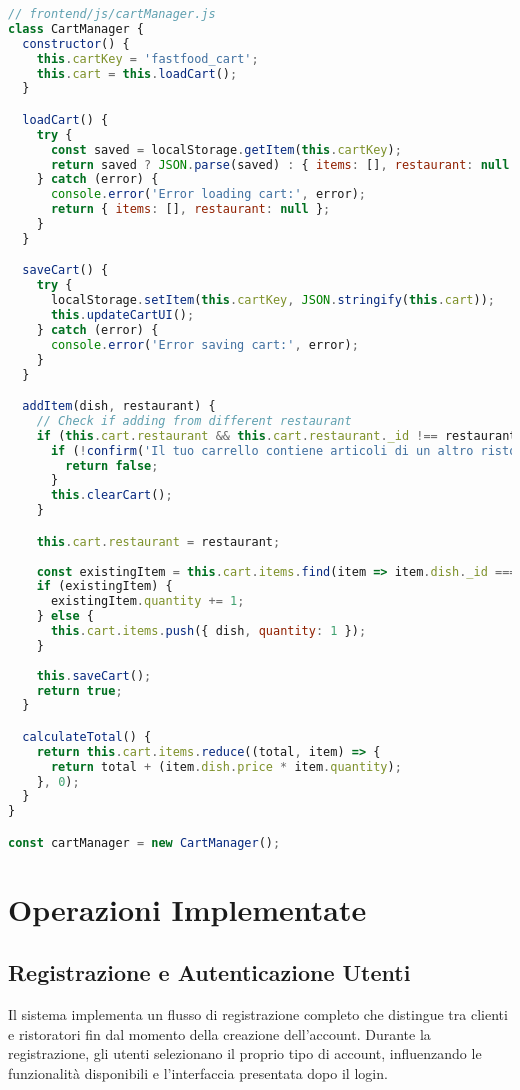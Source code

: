 \documentclass[12pt,a4paper]{article}
\begin{document}
\begin{lstlisting}[language=JavaScript, caption=Gestore del carrello]
// frontend/js/cartManager.js
class CartManager {
  constructor() {
    this.cartKey = 'fastfood_cart';
    this.cart = this.loadCart();
  }

  loadCart() {
    try {
      const saved = localStorage.getItem(this.cartKey);
      return saved ? JSON.parse(saved) : { items: [], restaurant: null };
    } catch (error) {
      console.error('Error loading cart:', error);
      return { items: [], restaurant: null };
    }
  }

  saveCart() {
    try {
      localStorage.setItem(this.cartKey, JSON.stringify(this.cart));
      this.updateCartUI();
    } catch (error) {
      console.error('Error saving cart:', error);
    }
  }

  addItem(dish, restaurant) {
    // Check if adding from different restaurant
    if (this.cart.restaurant && this.cart.restaurant._id !== restaurant._id) {
      if (!confirm('Il tuo carrello contiene articoli di un altro ristorante. Vuoi svuotarlo per iniziare un nuovo ordine?')) {
        return false;
      }
      this.clearCart();
    }

    this.cart.restaurant = restaurant;
    
    const existingItem = this.cart.items.find(item => item.dish._id === dish._id);
    if (existingItem) {
      existingItem.quantity += 1;
    } else {
      this.cart.items.push({ dish, quantity: 1 });
    }
    
    this.saveCart();
    return true;
  }

  calculateTotal() {
    return this.cart.items.reduce((total, item) => {
      return total + (item.dish.price * item.quantity);
    }, 0);
  }
}

const cartManager = new CartManager();
\end{lstlisting}

\section{Operazioni Implementate}

\subsection{Registrazione e Autenticazione Utenti}

Il sistema implementa un flusso di registrazione completo che distingue tra clienti e ristoratori fin dal momento della creazione dell'account. Durante la registrazione, gli utenti selezionano il proprio tipo di account, influenzando le funzionalità disponibili e l'interfaccia presentata dopo il login.
\end{document}
